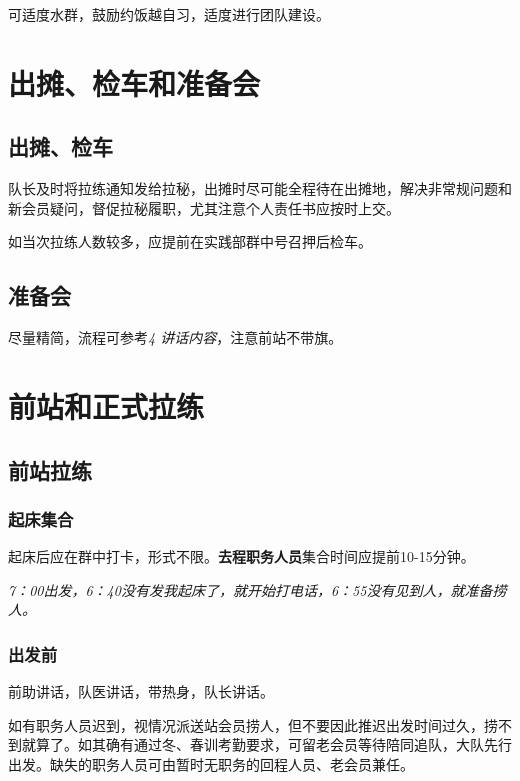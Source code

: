 \documentclass[UTF8]{ctexart}
\begin{document}
可适度水群，鼓励约饭越自习，适度进行团队建设。

\section{出摊、检车和准备会}

\subsection{出摊、检车}

队长及时将拉练通知发给拉秘，出摊时尽可能全程待在出摊地，解决非常规问题和新会员疑问，督促拉秘履职，尤其注意个人责任书应按时上交。

如当次拉练人数较多，应提前在实践部群中号召押后检车。

\subsection{准备会}

尽量精简，流程可参考{\color{blue}\textit{4 讲话内容}}，注意前站不带旗。

\section{前站和正式拉练}

\subsection{前站拉练}

\subsubsection{起床集合}

起床后应在群中打卡，形式不限。\textbf{去程职务人员}集合时间应提前10-15分钟。

\textit{7：00出发，6：40没有发我起床了，就开始打电话，6：55没有见到人，就准备捞人。}

\subsubsection{出发前}

前助讲话，队医讲话，带热身，队长讲话。

如有职务人员迟到，视情况派送站会员捞人，但不要因此推迟出发时间过久，捞不到就算了。如其确有通过冬、春训考勤要求，可留老会员等待陪同追队，大队先行出发。缺失的职务人员可由暂时无职务的回程人员、老会员兼任。
\end{document}

